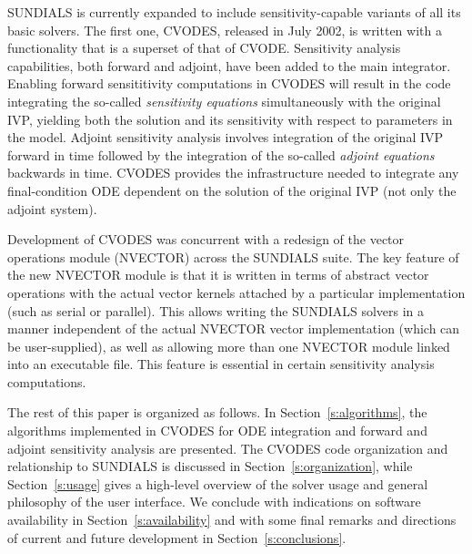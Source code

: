 SUNDIALS is currently expanded to include sensitivity-capable variants of all
its basic solvers. The first one, CVODES, released in July 2002, 
is written with a functionality that is a superset of that of CVODE. 
Sensitivity analysis capabilities, both forward and adjoint, have been added to 
the main integrator. Enabling forward sensititivity computations 
in CVODES will result in the code integrating the so-called 
{\em sensitivity equations} simultaneously with the original IVP, 
yielding both the solution and its sensitivity with respect to parameters in the model. 
Adjoint sensitivity analysis involves integration of the 
original IVP forward in time followed by the integration of the so-called 
{\em adjoint equations} backwards in time. 
CVODES provides the infrastructure needed to integrate any final-condition ODE
dependent on the solution of the original IVP (not only the adjoint system). 

Development of CVODES was concurrent with a redesign of the vector operations module 
(NVECTOR) across the SUNDIALS suite. The key feature of the new NVECTOR module is that it
is written in terms of abstract vector operations with the actual vector kernels attached
by a particular implementation (such as serial or parallel). This allows
writing the SUNDIALS solvers in a manner independent of the actual NVECTOR vector
implementation (which can be user-supplied), as well as allowing more than one 
NVECTOR module linked into an executable file. This feature is essential in certain
sensitivity analysis computations.

The rest of this paper is organized as follows. In Section~\ref{s:algorithms}, the
algorithms implemented in CVODES for ODE integration and forward and adjoint 
sensitivity analysis are presented. The CVODES code organization and relationship
to SUNDIALS is discussed in Section~\ref{s:organization}, while Section~\ref{s:usage}
gives a high-level overview of the solver usage and general
philosophy of the user interface. We conclude with indications on software availability
in Section~\ref{s:availability} and with some final remarks and directions
of current and future development in Section~\ref{s:conclusions}.
